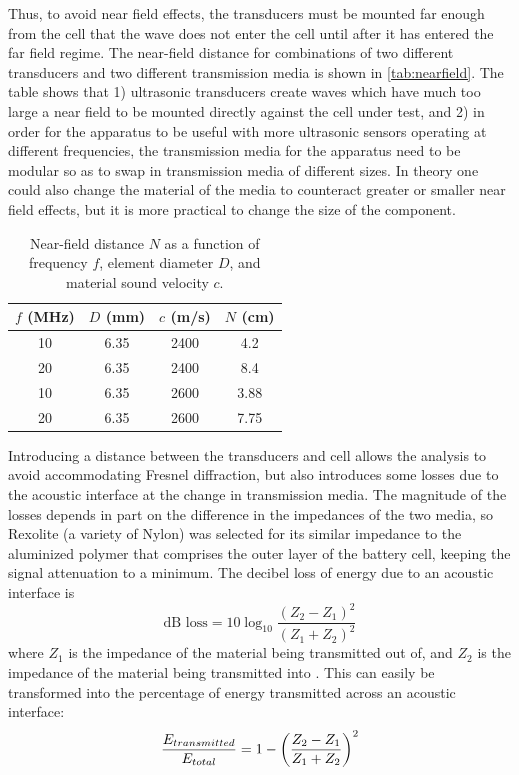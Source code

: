Thus, to avoid near field effects, the transducers must be mounted far enough from the cell that the wave does not enter the cell until after it has entered the far field regime. The near-field distance for combinations of two different transducers and two different transmission media is shown in \autoref{tab:nearfield}. The table shows that 1) ultrasonic transducers create waves which have much too large a near field to be mounted directly against the cell under test, and 2) in order for the apparatus to be useful with more ultrasonic sensors operating at different frequencies, the transmission media for the apparatus need to be modular so as to swap in transmission media of different sizes. In theory one could also change the material of the media to counteract greater or smaller near field effects, but it is more practical to change the size of the component. 

\begin{table}[h]
    \centering
    \begin{tabular}{c|c|c|c}
         $f$ (MHz) & $D$ (mm) & $c$ (m/s) & $N$ (cm) \\
         \hline
         10 & 6.35 & 2400 & 4.2 \\
         20 & 6.35 & 2400 & 8.4 \\
         10 & 6.35 & 2600 & 3.88 \\
         20 & 6.35 & 2600 & 7.75 \\
    \end{tabular}
    \caption{Near-field distance $N$ as a function of frequency $f$, element diameter $D$, and material sound velocity $c$.}
    \label{tab:nearfield}
\end{table}


Introducing a distance between the transducers and cell allows the analysis to avoid accommodating Fresnel diffraction, but also introduces some losses due to the acoustic interface at the change in transmission media. The magnitude of the losses depends in part on the difference in the impedances of the two media, so Rexolite (a variety of Nylon) was selected for its similar impedance to the aluminized polymer that comprises the outer layer of the battery cell, keeping the signal attenuation to a minimum.
The decibel loss of energy due to an acoustic interface is 
$$\text{dB loss} = 10\log _{10} \frac{(Z_2 - Z_1)^2}{(Z_1 + Z_2)^2}$$
where $Z_1$ is the impedance of the material being transmitted out of, and $Z_2$ is the impedance of the material being transmitted into \cite{OLYMPUS}. This can easily be transformed into the percentage of energy transmitted across an acoustic interface:
$$ \frac{E_{transmitted}}{E_{total}} = 1 - \bigg{(}\frac{Z_2 - Z_1}{Z_1 + Z_2} \bigg{)}^2$$

